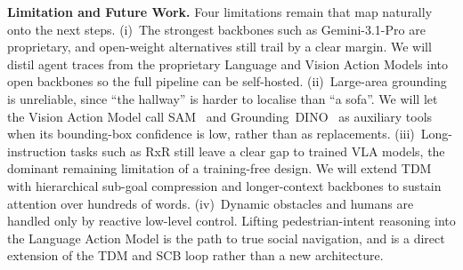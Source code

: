 \documentclass[conference]{IEEEtran}
\begin{document}
\textbf{Limitation and Future Work.} Four limitations remain that map
naturally onto the next steps. (i)~The strongest backbones such as
Gemini-3.1-Pro are proprietary, and open-weight alternatives still trail by a
clear margin. We will distil agent traces from the proprietary Language and
Vision Action Models into open backbones so the full pipeline can be
self-hosted. (ii)~Large-area grounding is unreliable, since ``the hallway'' is
harder to localise than ``a sofa''. We will let the Vision Action Model call
SAM~\cite{kirillov2023sam} and Grounding~DINO~\cite{liu2024grounding} as
auxiliary tools when its bounding-box confidence is low, rather than as
replacements. (iii)~Long-instruction tasks such as RxR still leave a clear gap
to trained VLA models, the dominant remaining limitation of a training-free design.
We will extend TDM with hierarchical sub-goal compression and longer-context
backbones to sustain attention over hundreds of words. (iv)~Dynamic obstacles
and humans are handled only by reactive low-level control. Lifting
pedestrian-intent reasoning into the Language Action Model is the path to true
social navigation, and is a direct extension of the TDM and SCB loop rather
than a new architecture.

{\fontsize{6pt}{7pt}\selectfont

}
\end{document}
